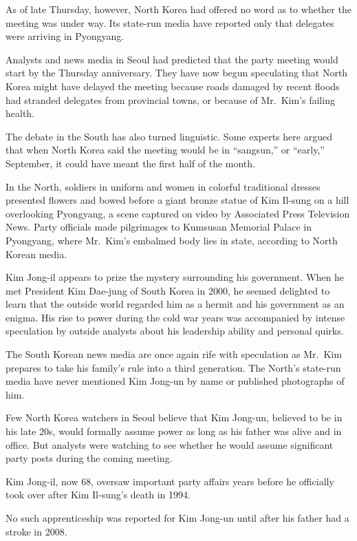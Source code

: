 ﻿\documentclass[12pt]{article}
\begin{document}
As of late Thursday, however, North Korea had offered no word as to whether the meeting was under
way. Its state-run media have reported only that delegates were arriving in Pyongyang.

Analysts and news media in Seoul had predicted that the party meeting would start by the Thursday
anniversary. They have now begun speculating that North Korea might have delayed the meeting because
roads damaged by recent floods had stranded delegates from provincial towns, or because of Mr.~Kim's
failing health.

The debate in the South has also turned linguistic. Some experts here argued that when North Korea
said the meeting would be in ``sangsun,'' or ``early,'' September, it could have meant the first
half of the month.

In the North, soldiers in uniform and women in colorful traditional dresses presented flowers and
bowed before a giant bronze statue of Kim Il-sung on a hill overlooking Pyongyang, a scene captured
on video by Associated Press Television News. Party officials made pilgrimages to Kumsusan Memorial
Palace in Pyongyang, where Mr.~Kim's embalmed body lies in state, according to North Korean media.

Kim Jong-il appears to prize the mystery surrounding his government. When he met President Kim
Dae-jung of South Korea in 2000, he seemed delighted to learn that the outside world regarded him as
a hermit and his government as an enigma. His rise to power during the cold war years was
accompanied by intense speculation by outside analysts about his leadership ability and personal
quirks.

The South Korean news media are once again rife with speculation as Mr.~Kim prepares to take his
family's rule into a third generation. The North's state-run media have never mentioned Kim Jong-un
by name or published photographs of him.

Few North Korea watchers in Seoul believe that Kim Jong-un, believed to be in his late 20s, would
formally assume power as long as his father was alive and in office. But analysts were watching to
see whether he would assume significant party posts during the coming meeting.

Kim Jong-il, now 68, oversaw important party affairs years before he officially took over after Kim
Il-sung's death in 1994.

No such apprenticeship was reported for Kim Jong-un until after his father had a stroke in 2008.
\end{document}
